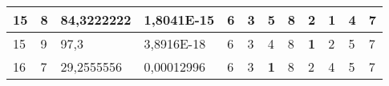 \documentclass[conference]{IEEEtran}
\begin{document}
\begin{table*}[]
\begin{tabular}{|llll|llllllll|}
\multicolumn{1}{|l|}{15}                                                    & \multicolumn{1}{l|}{8}                                                        & \multicolumn{1}{l|}{84,3222222}                                                   & 1,8041E-15                     & \multicolumn{1}{l|}{6}                                                  & \multicolumn{1}{l|}{3}                                                  & \multicolumn{1}{l|}{5}                                                  & \multicolumn{1}{l|}{8}                                                  & \multicolumn{1}{l|}{2}                                                  & \multicolumn{1}{l|}{\textbf{1}}                                         & \multicolumn{1}{l|}{4}                                                  & 7                          \\ \hline
\multicolumn{1}{|l|}{15}                                                    & \multicolumn{1}{l|}{9}                                                        & \multicolumn{1}{l|}{97,3}                                                         & 3,8916E-18                     & \multicolumn{1}{l|}{6}                                                  & \multicolumn{1}{l|}{3}                                                  & \multicolumn{1}{l|}{4}                                                  & \multicolumn{1}{l|}{8}                                                  & \multicolumn{1}{l|}{\textbf{1}}                                         & \multicolumn{1}{l|}{2}                                                  & \multicolumn{1}{l|}{5}                                                  & 7                          \\ \hline
\multicolumn{1}{|l|}{16}                                                    & \multicolumn{1}{l|}{7}                                                        & \multicolumn{1}{l|}{29,2555556}                                                   & 0,00012996                     & \multicolumn{1}{l|}{6}                                                  & \multicolumn{1}{l|}{3}                                                  & \multicolumn{1}{l|}{\textbf{1}}                                         & \multicolumn{1}{l|}{8}                                                  & \multicolumn{1}{l|}{2}                                                  & \multicolumn{1}{l|}{4}                                                  & \multicolumn{1}{l|}{5}                                                  & 7                          \\ \hline

\end{tabular}
\end{table*}
\end{document}
